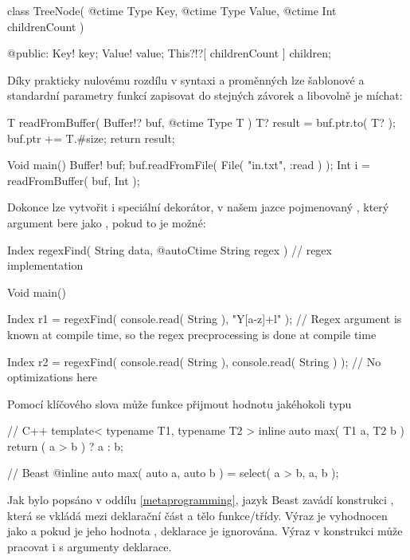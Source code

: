 \begin{code}
class TreeNode( @ctime Type Key, @ctime Type Value, @ctime Int childrenCount ) {
	
@public:
	Key! key;
	Value! value;
	This?!?[ childrenCount ] children;
	
}
\end{code}

Díky prakticky nulovému rozdílu v syntaxi \ctime a \nonctime proměnných lze šablonové a standardní parametry funkcí zapisovat do stejných závorek a libovolně je míchat:

\begin{code}
T readFromBuffer( Buffer!? buf, @ctime Type T ) {
	T? result = buf.ptr.to( T? );
	buf.ptr += T.#size;
	return result;
}

Void main() {
	Buffer! buf;
	buf.readFromFile( File( "in.txt", :read ) ); 
	Int i = readFromBuffer( buf, Int );
}
\end{code}

Dokonce lze vytvořit i speciální dekorátor, v našem jazce pojmenovaný , který argument bere jako \ctime, pokud to je možné: \nopagebreak

\begin{code}
Index regexFind( String data, @autoCtime String regex ) {
	// regex implementation
}

Void main() {
	Index r1 = regexFind( console.read( String ), "Y[a-z]+l" ); // Regex argument is known at compile time, so the regex precprocessing is done at compile time
	
	Index r2 = regexFind( console.read( String ), console.read( String ) ); // No optimizations here
}
\end{code}

Pomocí klíčového slova  může funkce přijmout hodnotu jakéhokoli typu

\begin{cppcode}
// C++
template< typename T1, typename T2 >
inline auto max( T1 a, T2 b ) {
	return ( a  > b ) ? a : b;
}
\end{cppcode}

\begin{code}
// Beast
@inline auto max( auto a, auto b ) = select( a > b, a, b );
\end{code}

Jak bylo popsáno v oddílu \ref{metaprogramming}, jazyk Beast zavádí konstrukci , která se vkládá mezi deklarační část a tělo funkce/třídy. Výraz  je vyhodnocen jako  a pokud je jeho hodnota , deklarace je ignorována. Výraz v konstrukci může pracovat i s \ctime argumenty deklarace.

